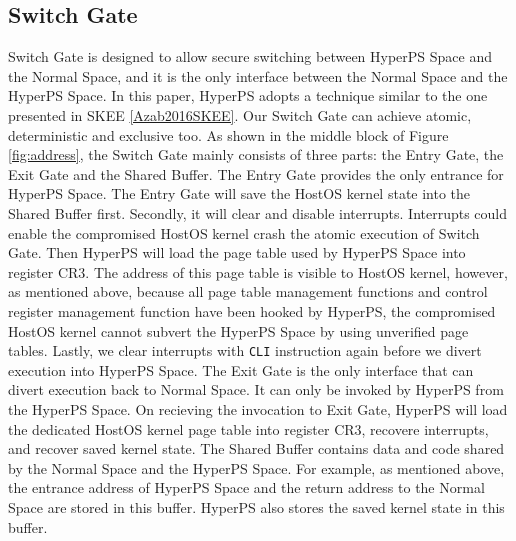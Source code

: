 \subsection{Switch Gate}
Switch Gate is designed to allow secure switching between HyperPS Space and the Normal Space, and it is the only interface between the Normal Space and the HyperPS Space. In this paper, HyperPS adopts a technique similar to the one presented in SKEE \ref{Azab2016SKEE}. Our Switch Gate can achieve atomic, deterministic and exclusive too.
As shown in the middle block of Figure \ref{fig:address}, the Switch Gate mainly consists of three parts: the Entry Gate, the Exit Gate and the Shared Buffer. 
The Entry Gate provides the only entrance for HyperPS Space. The Entry Gate will save the HostOS kernel state into the Shared Buffer first. Secondly, it will clear and disable interrupts. Interrupts could enable the compromised HostOS kernel crash the atomic execution of Switch Gate. Then HyperPS will load the page table used by HyperPS Space into register CR3. The address of this page table is visible to HostOS kernel, however, as mentioned above, because all page table management functions and control register management function have been hooked by HyperPS, the compromised HostOS kernel cannot subvert the HyperPS Space by using unverified page tables. Lastly, we clear interrupts with \verb|CLI| instruction again before we divert execution into HyperPS Space. 
The Exit Gate is the only interface that can divert execution back to Normal Space. It can only be invoked by HyperPS from the HyperPS Space. 
On recieving the invocation to Exit Gate, 
HyperPS will load the dedicated HostOS kernel page table into register CR3, recovere interrupts, and recover saved kernel state. 
The Shared Buffer contains data and code shared by the Normal Space and the HyperPS Space. For example, as mentioned above, the entrance address of HyperPS Space and the return address to the Normal Space are stored in this buffer. HyperPS also stores the saved kernel state in this buffer. 




